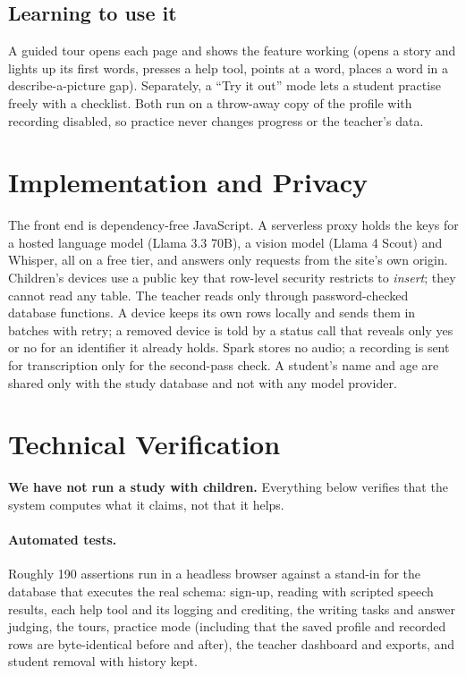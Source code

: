 \documentclass[manuscript, screen, review, anonymous]{acmart}
\begin{document}
\subsection{Learning to use it}
A guided tour opens each page and shows the feature working (opens a story and lights up its first words, presses a help tool, points at a word, places a word in a describe-a-picture gap). Separately, a ``Try it out'' mode lets a student practise freely with a checklist. Both run on a throw-away copy of the profile with recording disabled, so practice never changes progress or the teacher's data.

\section{Implementation and Privacy}
The front end is dependency-free JavaScript. A serverless proxy holds the keys for a hosted language model (Llama 3.3 70B), a vision model (Llama 4 Scout) and Whisper, all on a free tier, and answers only requests from the site's own origin. Children's devices use a public key that row-level security restricts to \emph{insert}; they cannot read any table. The teacher reads only through password-checked database functions. A device keeps its own rows locally and sends them in batches with retry; a removed device is told by a status call that reveals only yes or no for an identifier it already holds. Spark stores no audio; a recording is sent for transcription only for the second-pass check. A student's name and age are shared only with the study database and not with any model provider.

\section{Technical Verification}
\label{sec:eval}
\textbf{We have not run a study with children.} Everything below verifies that the system computes what it claims, not that it helps.

\paragraph{Automated tests.} Roughly 190 assertions run in a headless browser against a stand-in for the database that executes the real schema: sign-up, reading with scripted speech results, each help tool and its logging and crediting, the writing tasks and answer judging, the tours, practice mode (including that the saved profile and recorded rows are byte-identical before and after), the teacher dashboard and exports, and student removal with history kept.
\end{document}
